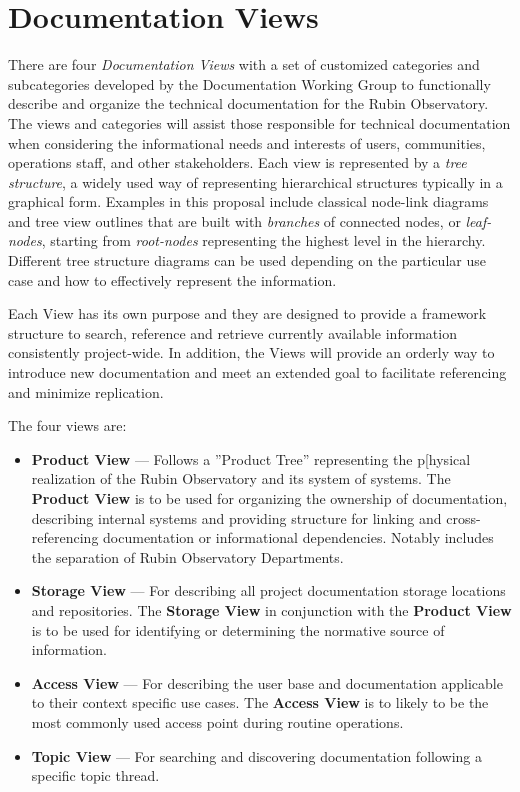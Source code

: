 \section{Documentation Views}
\label{sec:views}

There are four \emph{Documentation Views} with a set of customized categories and subcategories developed by the Documentation Working Group to functionally describe and organize the technical documentation for the Rubin Observatory.
The views and categories will assist those responsible for technical documentation when considering the informational needs and interests of users, communities, operations staff, and other stakeholders.
Each view is represented by a \emph{tree structure}, a widely used way of representing hierarchical structures typically in a graphical form.
Examples in this proposal include classical node-link diagrams and tree view outlines that are built with \emph{branches} of connected nodes, or \emph{leaf-nodes}, starting from \emph{root-nodes} representing the highest level in the hierarchy.
Different tree structure diagrams can be used depending on the particular use case and how to effectively represent the information.
\citep{wiki-tree-diagram-cite}

Each View has its own purpose and they are designed to provide a framework structure to search, reference and retrieve currently available information consistently project-wide.
In addition, the Views will provide an orderly way to introduce new documentation and meet an extended goal to facilitate referencing and minimize replication.

The four views are:

\begin{itemize}

  \item \textbf{Product View} --- Follows a ''Product Tree'' representing the p[hysical realization of the Rubin Observatory and its system of systems.  The \textbf{Product View} is to be used for organizing the ownership of documentation, describing internal systems and providing structure for linking and cross-referencing documentation or informational dependencies.
  Notably includes the separation of Rubin Observatory Departments.

  \item \textbf{Storage View} --- For describing all project documentation storage locations and repositories.
  The \textbf{Storage View} in conjunction with the \textbf{Product View} is to be used for identifying or determining the normative source of information.

  \item \textbf{Access View} --- For describing the user base and documentation applicable to their context specific use cases.  The \textbf{Access View} is to likely to be the most commonly used access point during routine operations. 

  \item \textbf{Topic View} --- For searching and discovering documentation following a specific topic thread.

\end{itemize}

